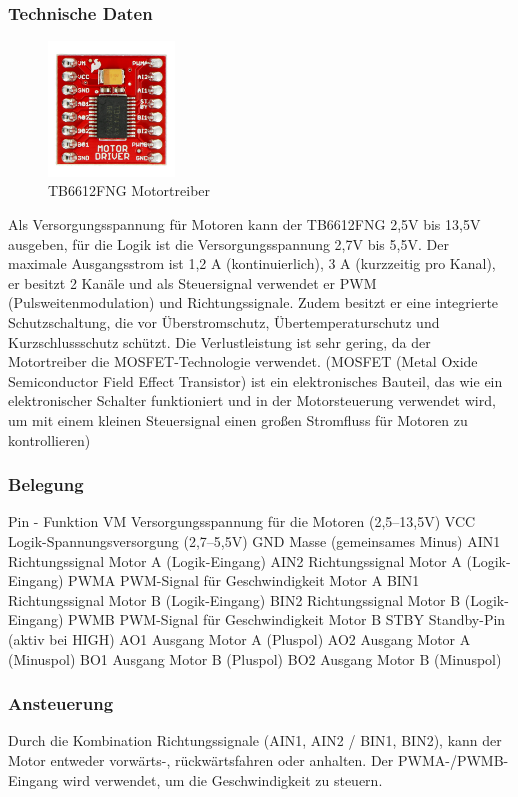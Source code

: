 \subsubsection{Technische Daten}
\begin{figure}[H]
    \centering
    \includegraphics[width=0.3\textwidth]{img/Hardware/Motortreiber.png}
    \caption{TB6612FNG Motortreiber}
    \label{fig:motortreiber}
\end{figure}
Als Versorgungsspannung für Motoren kann der TB6612FNG 2,5V bis 13,5V ausgeben,
für die Logik ist die Versorgungsspannung 2,7V bis 5,5V.
%
Der maximale Ausgangsstrom ist 1,2 A (kontinuierlich), 3 A (kurzzeitig pro Kanal),
er besitzt 2 Kanäle und als Steuersignal verwendet er PWM (Pulsweitenmodulation) und Richtungssignale.
%
Zudem besitzt er eine integrierte Schutzschaltung,
die vor Überstromschutz, Übertemperaturschutz und Kurzschlussschutz schützt. 
%
Die Verlustleistung ist sehr gering,
da der Motortreiber die MOSFET-Technologie verwendet.
%
(MOSFET (Metal Oxide Semiconductor Field Effect Transistor) ist ein elektronisches Bauteil, 
das wie ein elektronischer Schalter funktioniert und in der Motorsteuerung verwendet wird,
um mit einem kleinen Steuersignal einen großen Stromfluss für Motoren zu kontrollieren)
\subsubsection{Belegung}
Pin	-	Funktion
VM	Versorgungsspannung für die Motoren (2,5–13,5V)
VCC	Logik-Spannungsversorgung (2,7–5,5V)
GND	Masse (gemeinsames Minus)
AIN1	Richtungssignal Motor A (Logik-Eingang)
AIN2	Richtungssignal Motor A (Logik-Eingang)
PWMA	PWM-Signal für Geschwindigkeit Motor A
BIN1	Richtungssignal Motor B (Logik-Eingang)
BIN2	Richtungssignal Motor B (Logik-Eingang)
PWMB	PWM-Signal für Geschwindigkeit Motor B
STBY	Standby-Pin (aktiv bei HIGH)
AO1	Ausgang Motor A (Pluspol)
AO2	Ausgang Motor A (Minuspol)
BO1	Ausgang Motor B (Pluspol)
BO2	Ausgang Motor B (Minuspol)

\subsubsection{Ansteuerung}
Durch die Kombination Richtungssignale (AIN1, AIN2 / BIN1, BIN2),
kann der Motor entweder vorwärts-, rückwärtsfahren oder anhalten.
%
Der PWMA-/PWMB-Eingang wird verwendet, um die Geschwindigkeit zu steuern.
%
